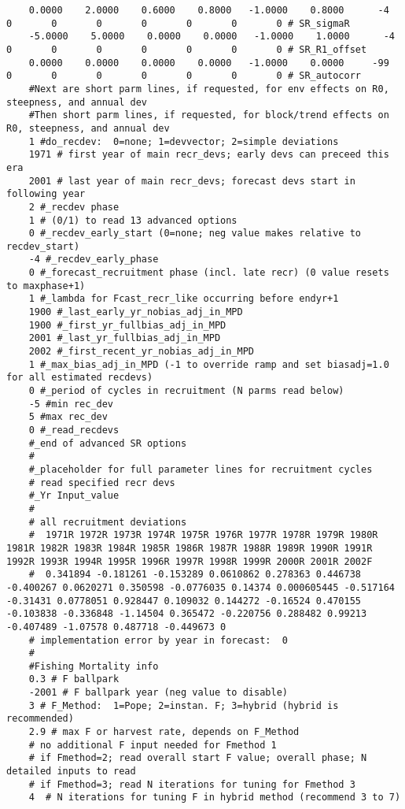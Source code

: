 \begin{landscape}
{\begin{verbatim}
	0.0000    2.0000    0.6000    0.8000   -1.0000    0.8000      -4       0       0       0       0       0       0       0 # SR_sigmaR
	-5.0000    5.0000    0.0000    0.0000   -1.0000    1.0000      -4       0       0       0       0       0       0       0 # SR_R1_offset
	0.0000    0.0000    0.0000    0.0000   -1.0000    0.0000     -99       0       0       0       0       0       0       0 # SR_autocorr
	#Next are short parm lines, if requested, for env effects on R0, steepness, and annual dev
	#Then short parm lines, if requested, for block/trend effects on R0, steepness, and annual dev
	1 #do_recdev:  0=none; 1=devvector; 2=simple deviations
	1971 # first year of main recr_devs; early devs can preceed this era
	2001 # last year of main recr_devs; forecast devs start in following year
	2 #_recdev phase 
	1 # (0/1) to read 13 advanced options
	0 #_recdev_early_start (0=none; neg value makes relative to recdev_start)
	-4 #_recdev_early_phase
	0 #_forecast_recruitment phase (incl. late recr) (0 value resets to maxphase+1)
	1 #_lambda for Fcast_recr_like occurring before endyr+1
	1900 #_last_early_yr_nobias_adj_in_MPD
	1900 #_first_yr_fullbias_adj_in_MPD
	2001 #_last_yr_fullbias_adj_in_MPD
	2002 #_first_recent_yr_nobias_adj_in_MPD
	1 #_max_bias_adj_in_MPD (-1 to override ramp and set biasadj=1.0 for all estimated recdevs)
	0 #_period of cycles in recruitment (N parms read below)
	-5 #min rec_dev
	5 #max rec_dev
	0 #_read_recdevs
	#_end of advanced SR options
	#
	#_placeholder for full parameter lines for recruitment cycles
	# read specified recr devs
	#_Yr Input_value
	#
	# all recruitment deviations
	#  1971R 1972R 1973R 1974R 1975R 1976R 1977R 1978R 1979R 1980R 1981R 1982R 1983R 1984R 1985R 1986R 1987R 1988R 1989R 1990R 1991R 1992R 1993R 1994R 1995R 1996R 1997R 1998R 1999R 2000R 2001R 2002F
	#  0.341894 -0.181261 -0.153289 0.0610862 0.278363 0.446738 -0.400267 0.0620271 0.350598 -0.0776035 0.14374 0.000605445 -0.517164 -0.31431 0.0778051 0.928447 0.109032 0.144272 -0.16524 0.470155 -0.103838 -0.336848 -1.14504 0.365472 -0.220756 0.288482 0.99213 -0.407489 -1.07578 0.487718 -0.449673 0
	# implementation error by year in forecast:  0
	#
	#Fishing Mortality info 
	0.3 # F ballpark
	-2001 # F ballpark year (neg value to disable)
	3 # F_Method:  1=Pope; 2=instan. F; 3=hybrid (hybrid is recommended)
	2.9 # max F or harvest rate, depends on F_Method
	# no additional F input needed for Fmethod 1
	# if Fmethod=2; read overall start F value; overall phase; N detailed inputs to read
	# if Fmethod=3; read N iterations for tuning for Fmethod 3
	4  # N iterations for tuning F in hybrid method (recommend 3 to 7)

\end{verbatim}}
\end{landscape}

